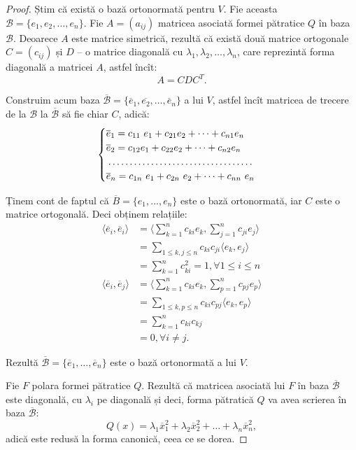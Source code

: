 \begin{proof}
	Știm că există o bază ortonormată pentru $V$. Fie aceasta $\mathcal{B} = \{
e_1, e_2, \dots, e_n\}$. Fie $A = (a_{ij})$ matricea asociată formei pătratice
$Q$ în baza $\mathcal{B}$. Deoarece $A$ este matrice simetrică, rezultă că
există două matrice ortogonale $C = (c_{ij})$ și $D$ -- o matrice diagonală
cu $\lambda_1, \lambda_2, \dots, \lambda_n$, care reprezintă forma diagonală a
matricei $A$, astfel încît: 
 \[
	A = CDC^T.
\]

Construim acum baza $\overline{\mathcal{B}} = \{\overline{e}_1, \overline{e_2},
\dots, \overline{e}_n\}$ a lui $V$, astfel încît matricea de trecere de la 
$\mathcal{B}$ la $\overline{\mathcal{B}}$ să fie chiar $C$, adică: 
 \[
	\begin{cases}	
	    \overline{e}_1 = c_{11} e_1 + c_{21}e_2 + \dots + c_{n1} e_n \\
	    \overline{e}_2 = c_{12} e_1 + c_{22} e_2 + \dots + c_{n2} e_n \\
	    \dotfill \\
	    \overline{e}_n = c_{1n} e_1 + c_{2n} e_2 + \dots + c_{nn} e_n
    \end{cases}
\]

Ținem cont de faptul că $\overline{B} = \{e_1, \dots, e_n\}$ este o bază
ortonormată, iar $C$ este o matrice ortogonală. Deci obținem relațiile:
\begin{align*}
	\langle \overline{e}_i, \overline{e}_i \rangle &=
	\Big\langle \sum_{k = 1}^n c_{ki} e_k, \sum_{j = 1}^n c_{ji} e_j 
	\Big \rangle \\
	&= \sum_{1 \leq k, j \leq n} c_{ki} c_{ji} \langle e_k, e_j \rangle \\
	&= \sum_{k=1}^n c_{ki}^2 = 1, \forall 1 \leq i \leq n \\
    \langle \overline{e}_i, \overline{e}_j \rangle &=
    \Big\langle \sum_{k=1}^n c_{ki} e_k, \sum_{p=1}^n c_{pj}e_p 
    \Big \rangle \\
    &= \sum_{1 \leq k,p \leq n} c_{ki} c_{pj} \langle e_k, e_p \rangle \\
    &= \sum_{k = 1}^n c_{ki} c_{kj} \\
    &= 0, \forall i \neq j.
\end{align*}

Rezultă $\overline{\mathcal{B}} = \{\overline{e}_1, \dots, \overline{e}_n \}$
este o bază ortonormată a lui $V$.

Fie $F$ polara formei pătratice $Q$. Rezultă că matricea asociată lui $F$ în
baza $\overline{\mathcal{B}}$ este diagonală, cu $\lambda_i$ pe diagonală și
deci, forma pătratică $Q$ va avea scrierea în baza $\overline{\mathcal{B}}$: 
 \[
	Q(x) = \lambda_1 \overline{x}_1^2 + \lambda_2 \overline{x}_2^2 + \dots
	        + \lambda_n \overline{x}_n^2,
\]
adică este redusă la forma canonică, ceea ce se dorea.
\end{proof}

